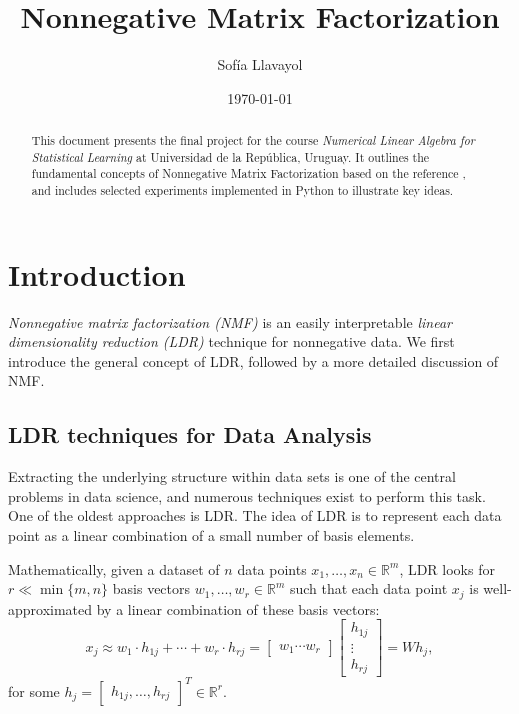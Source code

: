 \documentclass{amsart}
\title{Nonnegative Matrix Factorization}
\author{Sofía Llavayol}
\date{\today}
\newcommand{\R}{\mathbb{R}}
\begin{document}
\begin{abstract}
    This document presents the final project for the course \textit{Numerical Linear Algebra for Statistical Learning} at Universidad de la República, Uruguay. It outlines the fundamental concepts of Nonnegative Matrix Factorization based on the reference \cite{G}, and includes selected experiments implemented in Python to illustrate key ideas.
\end{abstract}


\maketitle

\section{Introduction}

{\it Nonnegative matrix factorization (NMF)} is an easily interpretable {\it linear dimensionality reduction (LDR)} technique for nonnegative data. We first introduce the general concept of LDR, followed by a more detailed discussion of NMF.

\subsection{LDR techniques for Data
Analysis}

Extracting the underlying structure within data sets is one of the central problems in data science, and numerous techniques exist to perform this task. One of the oldest approaches is LDR. The idea of LDR is to represent each data point as a linear combination of a small number of basis elements.

Mathematically, given a dataset of $n$ data points $x_1, \ldots, x_n \in\R^m$, LDR looks for $r\ll\min\{m,n\}$ basis vectors $w_1, \ldots, w_r \in\R^m$ such that each data point $x_j$ is well-approximated by a linear combination of these basis vectors:
\[
    x_j\approx w_1\cdot h_{1j} +\cdots +w_r\cdot h_{rj}=
    \begin{bmatrix}
        w_1 \cdots w_r
    \end{bmatrix}
    \begin{bmatrix}
        h_{1j}\\
        \vdots\\
        h_{rj}
    \end{bmatrix}= W h_j,
\]
for some $h_j= \begin{bmatrix} h_{1j}, \ldots, h_{rj} \end{bmatrix}^T \in\R^r$.
\end{document}
